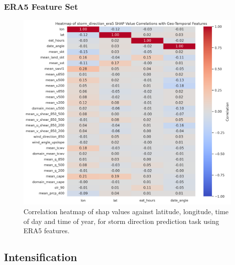 \subsubsection{ERA5 Feature Set}
\begin{figure}[ht]
    \centering
    \includegraphics[width=\textwidth]{../figures/generated/experiments/storm_direction/storm_direction_era5_shap_correlation_heatmap.png}
    \caption{Correlation heatmap of \acrshort{shap} values against latitude, longitude, time of day and time of year, for storm direction prediction task using ERA5 features.}
    \label{fig:storm_direction_era5_shap_heatmap}
\end{figure}

\subsection{Intensification}
\label{appn:shap-heatmaps-int}


